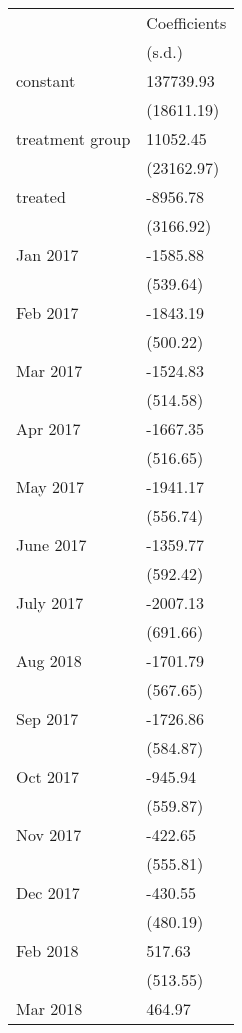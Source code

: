 \begin{tabular}{ll}
\toprule
{} & Coefficients \\
{} &       (s.d.) \\
\midrule
constant        &    137739.93 \\
                &   (18611.19) \\
treatment group &     11052.45 \\
                &   (23162.97) \\
treated         &     -8956.78 \\
                &    (3166.92) \\
Jan 2017        &     -1585.88 \\
                &     (539.64) \\
Feb 2017        &     -1843.19 \\
                &     (500.22) \\
Mar 2017        &     -1524.83 \\
                &     (514.58) \\
Apr 2017        &     -1667.35 \\
                &     (516.65) \\
May 2017        &     -1941.17 \\
                &     (556.74) \\
June 2017       &     -1359.77 \\
                &     (592.42) \\
July 2017       &     -2007.13 \\
                &     (691.66) \\
Aug 2018        &     -1701.79 \\
                &     (567.65) \\
Sep 2017        &     -1726.86 \\
                &     (584.87) \\
Oct 2017        &      -945.94 \\
                &     (559.87) \\
Nov 2017        &      -422.65 \\
                &     (555.81) \\
Dec 2017        &      -430.55 \\
                &     (480.19) \\
Feb 2018        &       517.63 \\
                &     (513.55) \\
Mar 2018        &       464.97 \\

\end{tabular}
